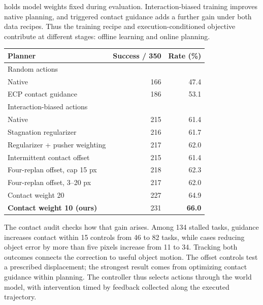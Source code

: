 \begin{table}[!t]
\begin{minipage}[t]{\columnwidth}
 holds model weights fixed during evaluation. Interaction-biased training improves native planning, and triggered contact guidance adds a further gain under both data recipes. Thus the training recipe and execution-conditioned objective contribute at different stages: offline learning and online planning.\par
\end{minipage}\hfill
\begin{minipage}[t]{\columnwidth}
\vspace{0pt}
\par\smallskip
{\centering
\centering
{}
\label{tab:lewm-contact}
\small
\begin{tabular}{lrr}
\toprule
Planner & Success / 350 & Rate (\%)\\
\midrule
\multicolumn{3}{l}{Random actions}\\
Native &166&47.4\\
ECP contact guidance &186&53.1\\
\midrule
\multicolumn{3}{l}{Interaction-biased actions}\\
Native &215&61.4\\
Stagnation regularizer &216&61.7\\
Regularizer + pusher weighting &217&62.0\\
Intermittent contact offset &215&61.4\\
Four-replan offset, cap 15 px &218&62.3\\
Four-replan offset, 3--20 px &217&62.0\\
Contact weight 20 &227&64.9\\
\textbf{Contact weight 10 (ours)} &231&\textbf{66.0}\\
\bottomrule
\end{tabular}
\par}
\par\smallskip
\normalsize
The contact audit checks how that gain arises. Among 134 stalled tasks, guidance increases contact within 15 controls from 46 to 82 tasks, while cases reducing object error by more than five pixels increase from 11 to 34. Tracking both outcomes connects the correction to useful object motion. The offset controls test a prescribed displacement; the strongest result comes from optimizing contact guidance within planning. The controller thus selects actions through the world model, with intervention timed by feedback collected along the executed trajectory.\par
\end{minipage}\par
\par\smallskip
\noindent \begin{minipage}[t]{\columnwidth}
\vspace{0pt}

\end{minipage}
\end{table}
